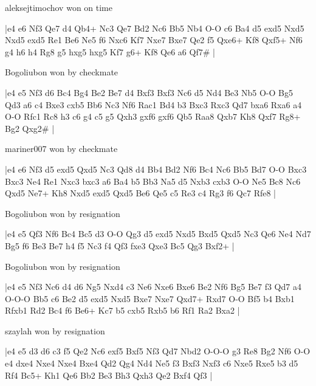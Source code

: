 \showboard

aleksejtimochov won on time

\makegametitle
|e4 e6 Nf3 Qe7 d4 Qb4+ Nc3 Qe7 Bd2 Nc6 Bb5 Nb4 O-O c6 Ba4 d5 exd5 Nxd5 Nxd5 exd5 Re1 Be6 Ne5 f6 Nxc6 Kf7 Nxe7 Bxe7 Qe2 f5 Qxe6+ Kf8 Qxf5+ Nf6 g4 h6 h4 Rg8 g5 hxg5 hxg5 Kf7 g6+ Kf8 Qe6 a6 Qf7\#  |

\showboard

Bogoliubon won by checkmate

\makegametitle
|e4 e5 Nf3 d6 Bc4 Bg4 Be2 Be7 d4 Bxf3 Bxf3 Nc6 d5 Nd4 Be3 Nb5 O-O Bg5 Qd3 a6 c4 Bxe3 cxb5 Bb6 Nc3 Nf6 Rac1 Bd4 b3 Bxc3 Rxc3 Qd7 bxa6 Rxa6 a4 O-O Rfc1 Rc8 h3 c6 g4 c5 g5 Qxh3 gxf6 gxf6 Qb5 Raa8 Qxb7 Kh8 Qxf7 Rg8+ Bg2 Qxg2\#  |

\showboard

mariner007 won by checkmate

\makegametitle
|e4 e6 Nf3 d5 exd5 Qxd5 Nc3 Qd8 d4 Bb4 Bd2 Nf6 Bc4 Nc6 Bb5 Bd7 O-O Bxc3 Bxc3 Ne4 Re1 Nxc3 bxc3 a6 Ba4 b5 Bb3 Na5 d5 Nxb3 cxb3 O-O Ne5 Bc8 Nc6 Qxd5 Ne7+ Kh8 Nxd5 exd5 Qxd5 Be6 Qe5 c5 Re3 c4 Rg3 f6 Qc7 Rfe8  |

\showboard

Bogoliubon won by resignation

\makegametitle
|e4 e5 Qf3 Nf6 Bc4 Bc5 d3 O-O Qg3 d5 exd5 Nxd5 Bxd5 Qxd5 Nc3 Qe6 Ne4 Nd7 Bg5 f6 Be3 Be7 h4 f5 Nc3 f4 Qf3 fxe3 Qxe3 Bc5 Qg3 Bxf2+  |

\showboard

Bogoliubon won by resignation

\makegametitle
|e4 e5 Nf3 Nc6 d4 d6 Ng5 Nxd4 c3 Ne6 Nxe6 Bxe6 Be2 Nf6 Bg5 Be7 f3 Qd7 a4 O-O-O Bb5 c6 Be2 d5 exd5 Nxd5 Bxe7 Nxe7 Qxd7+ Rxd7 O-O Bf5 b4 Bxb1 Rfxb1 Rd2 Bc4 f6 Be6+ Kc7 b5 cxb5 Rxb5 b6 Rf1 Ra2 Bxa2  |

\showboard

szaylah won by resignation

\makegametitle
|e4 e5 d3 d6 c3 f5 Qe2 Nc6 exf5 Bxf5 Nf3 Qd7 Nbd2 O-O-O g3 Re8 Bg2 Nf6 O-O e4 dxe4 Nxe4 Nxe4 Bxe4 Qd2 Qg4 Nd4 Ne5 f3 Bxf3 Nxf3 c6 Nxe5 Rxe5 b3 d5 Rf4 Bc5+ Kh1 Qe6 Bb2 Be3 Bh3 Qxh3 Qe2 Bxf4 Qf3  |

